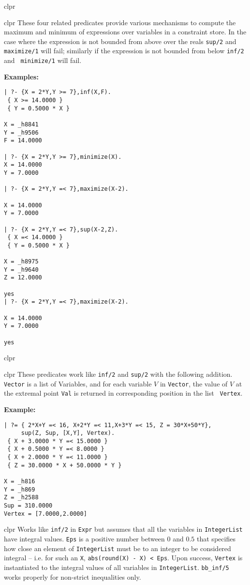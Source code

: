 \begin{description}
 {clpr} 

 {clpr} 
%
These four related predicates provide various mechanisms to compute
the maximum and minimum of expressions over variables in a constraint
store.  In the case where the expression is not bounded from above
over the reals {\tt sup/2} and {\tt maximize/1} will fail; similarly
if the expression is not bounded from below {\tt inf/2} and {\tt
minimize/1} will fail.

{\bf Examples:}
{\small
\begin{verbatim}
| ?- {X = 2*Y,Y >= 7},inf(X,F).
 { X >= 14.0000 }
 { Y = 0.5000 * X }

X = _h8841
Y = _h9506
F = 14.0000

| ?- {X = 2*Y,Y >= 7},minimize(X).
X = 14.0000
Y = 7.0000

| ?- {X = 2*Y,Y =< 7},maximize(X-2).

X = 14.0000
Y = 7.0000

| ?- {X = 2*Y,Y =< 7},sup(X-2,Z).
 { X =< 14.0000 }
 { Y = 0.5000 * X }

X = _h8975
Y = _h9640
Z = 12.0000

yes
| ?- {X = 2*Y,Y =< 7},maximize(X-2).

X = 14.0000
Y = 7.0000

yes
\end{verbatim}
}

 {clpr} 

 {clpr} 
%
These predicates work like {\tt inf/2} and {\tt sup/2} with the
following addition.  {\tt Vector} is a list of Variables, and for each
variable $V$ in {\tt Vector}, the value of $V$ at the extremal point
{\tt Val} is returned in corresponding position in the list {\tt
  Vertex}.

{\bf Example:}
{\small 
\begin{verbatim}
| ?= { 2*X+Y =< 16, X+2*Y =< 11,X+3*Y =< 15, Z = 30*X+50*Y},
     sup(Z, Sup, [X,Y], Vertex).
 { X + 3.0000 * Y =< 15.0000 }
 { X + 0.5000 * Y =< 8.0000 }
 { X + 2.0000 * Y =< 11.0000 }
 { Z = 30.0000 * X + 50.0000 * Y }

X = _h816
Y = _h869
Z = _h2588
Sup = 310.0000
Vertex = [7.0000,2.0000]
\end{verbatim}
}

  {clpr}
%
Works like {\tt inf/2} in {\tt Expr} but assumes that all the
variables in {\tt IntegerList} have integral values.  {\tt Eps} is a
positive number between $0$ and $0.5$ that specifies how close an
element of {\tt IntegerList} must be to an integer to be considered
integral -- i.e. for such an {\tt X}, {\tt abs(round(X) - X) < Eps}.
Upon success, {\tt Vertex} is instantiated to the integral values of
all variables in {\tt IntegerList}.  {\tt bb\_inf/5} works properly for
non-strict inequalities only.


\end{description}
